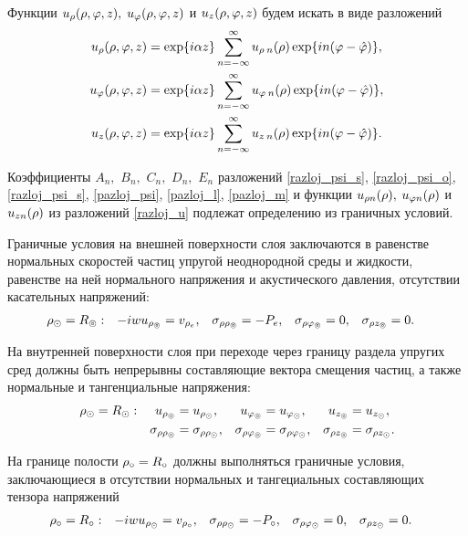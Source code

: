 Функции $u_\rho(\rho, \varphi, z),$ $u_\varphi(\rho, \varphi, z)$ и $u_z(\rho, \varphi, z)$ будем искать в виде разложений
\begin{equation}\label{razloj_u}
\begin{aligned}
u_\rho(\rho, \varphi, z)&=\exp\{i\alpha z\}\sum_{n=-\infty}^{\infty}u_{\rho\:n}(\rho)\exp\{in(\varphi-\hat{\varphi})\},\\
u_\varphi(\rho, \varphi, z)&=\exp\{i\alpha z\}\sum_{n=-\infty}^{\infty}u_{\varphi\:n}(\rho)\exp\{in(\varphi-\hat{\varphi})\},\\
u_z(\rho, \varphi, z)&=\exp\{i\alpha z\}\sum_{n=-\infty}^{\infty}u_{z\:n}(\rho)\exp\{in(\varphi-\hat{\varphi})\}.
\end{aligned}
\end{equation}

Коэффициенты $A_n,$ $B_n,$ $C_n,$ $D_n,$ $E_n$ разложений \eqref{razloj_psi_s}, \eqref{razloj_psi_o}, \eqref{razloj_psi_s}, \eqref{pazloj_psi}, \eqref{pazloj_l}, \eqref{pazloj_m} и функции $u_{\rho n}(\rho),$ $u_{\varphi n}(\rho)$ и $u_{z n}(\rho)$ из разложений \eqref{razloj_u} подлежат определению из граничных условий.

Граничные условия на внешней поверхности слоя заключаются в равенстве нормальных скоростей частиц упругой неоднородной среды и жидкости, равенстве на ней нормального напряжения и акустического давления, отсутствии касательных напряжений:
\begin{equation}\label{vneshnaja_pover_sloja}
\begin{aligned}
\rho_\odot &=R_\circledcirc: &-iwu_{\rho_\circledcirc}&=v_{\rho_e}, &\sigma_{\rho\rho_\circledcirc}&=-P_e, &\sigma_{\rho\varphi_\circledcirc}&=0, &\sigma_{\rho z_\circledcirc}&=0.
\end{aligned}
\end{equation}

На внутренней поверхности слоя при переходе через границу раздела упругих сред должны быть непрерывны составляющие вектора смещения частиц, а также нормальные и тангенциальные напряжения:
\begin{equation}\label{vnutr_pover_sloja}
\begin{aligned}
\rho_\odot&=R_\odot: &u_{\rho_\circledcirc}&=u_{\rho_\odot}, &u_{\varphi_\circledcirc}&=u_{\varphi_\odot}, &u_{z_\circledcirc}&=u_{z_\odot},\\
& &\sigma_{\rho\rho_\circledcirc}&=\sigma_{\rho\rho_\odot}, &\sigma_{\rho\varphi_\circledcirc}&=\sigma_{\rho\varphi_\odot},  &\sigma_{\rho z_\circledcirc}&=\sigma_{\rho z_\odot}.
\end{aligned}
\end{equation}

На границе полости $\rho_\circ=R_\circ$ должны выполняться граничные условия, заключающиеся в отсутствии нормальных и тангециальных составляющих тензора напряжений
\begin{equation}\label{gran_pol}
\begin{aligned}
\rho_\circ &=R_\circ: &-iwu_{\rho_\odot}&=v_{\rho_\circ}, &\sigma_{\rho\rho_\odot}&=-P_\circ, &\sigma_{\rho\varphi_\odot}&=0, &\sigma_{\rho z_\odot}&=0.
\end{aligned}
\end{equation}

